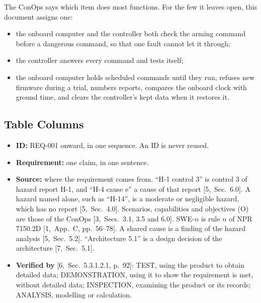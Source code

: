\documentclass[11pt,a4paper]{article}
\begin{document}
The ConOps says which item does most functions. For the few it leaves open,
this document assigns one:
\begin{itemize}
\item the onboard computer and the controller both check the arming command
  before a dangerous command, so that one fault cannot let it through;
\item the controller answers every command and tests itself;
\item the onboard computer holds scheduled commands until they run, refuses
  new firmware during a trial, numbers reports, compares the onboard clock with
  ground time, and clears the controller's kept data when it restores it.
\end{itemize}

\subsection{Table Columns}
\begin{itemize}
\item \textbf{ID:} REQ-001 onward, in one sequence. An ID is never reused.
\item \textbf{Requirement:} one claim, in one sentence.
\item \textbf{Source:} where the requirement comes from. ``H-1 control 3'' is
  control 3 of hazard report H-1, and ``H-4 cause e'' a cause of that report
  [5,~Sec.~6.0]. A hazard named alone, such as ``H-14'', is a moderate or
  negligible hazard, which has no report [5,~Sec.~4.0]. Scenarios, capabilities and
  objectives (O) are those of the ConOps [3,~Secs.~3.1, 3.5 and 6.0]. SWE-$n$ is
  rule $n$ of NPR 7150.2D [1,~App.~C, pp.~56--78]. A shared cause is a finding
  of the hazard analysis [5,~Sec.~5.2]. ``Architecture 5.1'' is a design
  decision of the architecture [7,~Sec.~5.1].
\item \textbf{Verified by} [6,~Sec.~5.3.1.2.1, p.~92]: TEST, using the product
  to obtain detailed data; DEMONSTRATION, using it to show the requirement is
  met, without detailed data; INSPECTION, examining the product or its
  records; ANALYSIS, modelling or calculation.
\end{itemize}

\end{document}

